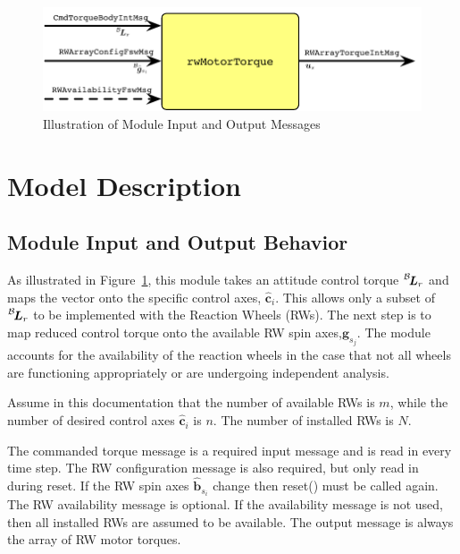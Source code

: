 
\begin{figure}[htb]
	\centerline{
	\includegraphics[]{Figures/moduleImg}
	}
	\caption{Illustration of Module Input and Output Messages}
	\label{fig:moduleImg}
\end{figure}


\section{Model Description}

\subsection{Module Input and Output Behavior}
As illustrated in Figure~\ref{fig:moduleImg}, this module takes an attitude control torque $\leftexp{B}{\bm L_{r}}$ and maps the vector onto the specific control axes, $\hat{\bm c}_{i}$.  This allows only a subset of $\leftexp{B}{\bm L_{r}}$ to be implemented with the Reaction Wheels (RWs).  The next step is to map reduced control torque onto  the available RW spin axes,$\hat{\bm g}_{s_j}$. The module accounts for the availability of the reaction wheels in the case that not all wheels are functioning appropriately or are undergoing independent analysis.  

Assume in this documentation that the number of available RWs is $m$, while the number of desired control axes $\hat{\bm c}_{i}$ is $n$.  The number of installed RWs is $N$.

The commanded torque message is a required input message and is read in every time step.  The RW configuration message is also required, but only read in during reset.  If the RW spin axes $\hat{\bm b}_{s_{i}}$ change then reset() must be called again.  The RW availability message is optional.  If the availability message is not used, then all installed RWs are assumed to be available.  The output message is always the array of RW motor torques.  




